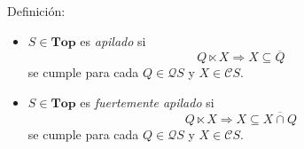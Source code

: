 \documentclass[compress,12pt]{beamer}
\begin{document}
\begin{frame}
\begin{block}{Definición:}
	\begin{itemize}
		\item $S\in \mathbf{Top}$ es \emph{apilado} si
		\[
		Q\ltimes X\Rightarrow X\subseteq \overline{Q}
		\] 
		se cumple para cada $Q\in \mathcal{Q}S$ y $X\in \mathcal{C}S$.
		\item<2-> $S\in \mathbf{Top}$ es \emph{fuertemente apilado} si 
		\[
		Q\ltimes X\Rightarrow X\subseteq \overline{X\cap Q}
		\]
		se cumple para cada $Q\in \mathcal{Q}S$ y $X\in \mathcal{C}S$.
	\end{itemize}
\end{block}

\end{frame}
\end{document}

